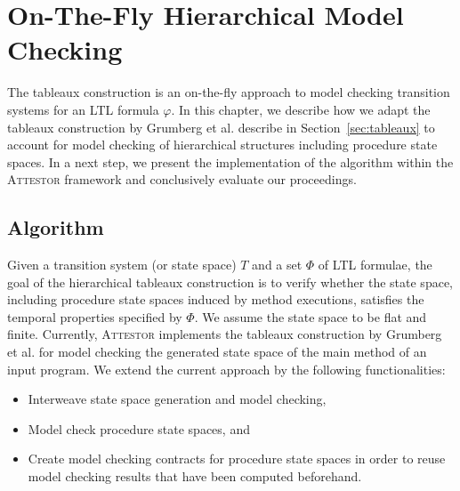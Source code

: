 \documentclass[a4paper, 12pt, twoside]{report}
\begin{document}
	\chapter{On-The-Fly Hierarchical Model Checking}\label{chp:otf}
	
	The tableaux construction is an on-the-fly approach to model checking transition systems for an LTL formula $\varphi$. In this chapter, we describe how we adapt the tableaux construction by Grumberg et al. describe in Section~\ref{sec:tableaux} to account for model checking of hierarchical structures including procedure state spaces. In a next step, we present the implementation of the algorithm within the \textsc{Attestor} framework and conclusively evaluate our proceedings.
	
	\section{Algorithm}
	
	Given a transition system (or state space) $T$ and a set $\Phi$ of LTL formulae, the goal of the hierarchical tableaux construction is to verify whether the state space, including procedure state spaces induced by method executions, satisfies the temporal properties specified by $\Phi$. We assume the state space to be flat and finite. Currently, \textsc{Attestor} implements the tableaux construction by Grumberg et al. for model checking the generated state space of the main method of an input program. We extend the current approach by the following functionalities:
	\begin{itemize}
		\item Interweave state space generation and model checking,
		\item Model check procedure state spaces, and
		\item Create model checking contracts for procedure state spaces in order to reuse model checking results that have been computed beforehand.
	\end{itemize}	
\end{document}
